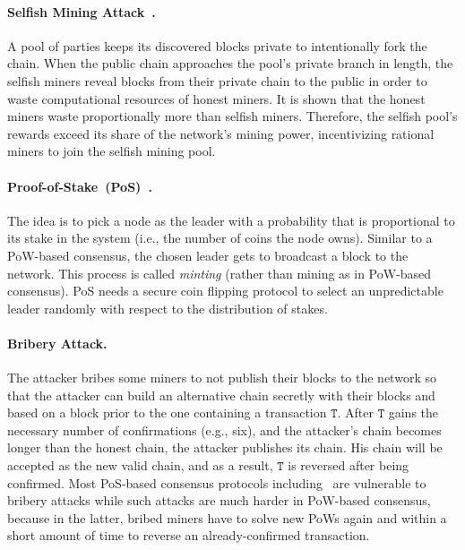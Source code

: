 \documentclass[11pt]{article}
\theoremstyle{mytheoremstyle}
\begin{document}
\paragraph{Selfish Mining Attack~\cite{eyal2014}.} A pool of parties keeps its discovered blocks private to intentionally fork the chain. When the public chain approaches the pool's private branch in length, the selfish miners reveal blocks from their private chain to the public in order to waste computational resources of honest miners. It is shown that the honest miners waste proportionally more than selfish miners. Therefore, the selfish pool's rewards exceed its share of the network's mining power, incentivizing rational miners to join the selfish mining pool.

\paragraph{Proof-of-Stake~(PoS)~\cite{cryptoeprint:2016:889}.} The idea is to pick a node as the leader with a probability that is proportional to its stake in the system (i.e., the number of coins the node owns). Similar to a PoW-based consensus, the chosen leader gets to broadcast a block to the network. This process is called \emph{minting} (rather than mining as in PoW-based consensus). PoS needs a secure coin flipping protocol to select an unpredictable leader randomly with respect to the distribution of stakes.

\paragraph{Bribery Attack.} The attacker bribes some miners to not publish their blocks to the network so that the attacker can build an alternative chain secretly with their blocks and based on a block prior to the one containing a transaction $\mathtt{T}$. After $\mathtt{T}$ gains the necessary number of confirmations (e.g., six), and the attacker's chain becomes longer than the honest chain, the attacker publishes its chain. His chain will be accepted as the new valid chain, and as a result, $\mathtt{T}$ is reversed after being confirmed. Most PoS-based consensus protocols including~\cite{cryptoeprint:2016:889,algorand16} are vulnerable to bribery attacks while such attacks are much harder in PoW-based consensus, because in the latter, bribed miners have to solve new PoWs again and within a short amount of time to reverse an already-confirmed transaction.
\end{document}
